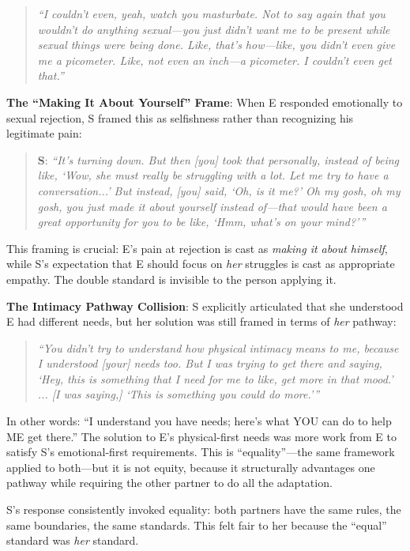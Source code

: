 \documentclass[12pt,openany]{book}
\numberwithin{equation}{chapter}
\begin{document}
\begin{quote}
\textit{``I couldn't even, yeah, watch you masturbate. Not to say again that you wouldn't do anything sexual---you just didn't want me to be present while sexual things were being done. Like, that's how---like, you didn't even give me a picometer. Like, not even an inch---a picometer. I couldn't even get that.''}
\end{quote}

\textbf{The ``Making It About Yourself'' Frame}: When E responded emotionally to sexual rejection, S framed this as selfishness rather than recognizing his legitimate pain:

\begin{quote}
\textbf{S}: \textit{``It's turning down. But then [you] took that personally, instead of being like, `Wow, she must really be struggling with a lot. Let me try to have a conversation...' But instead, [you] said, `Oh, is it me?' Oh my gosh, oh my gosh, you just made it about yourself instead of---that would have been a great opportunity for you to be like, `Hmm, what's on your mind?'''}
\end{quote}

This framing is crucial: E's pain at rejection is cast as \textit{making it about himself}, while S's expectation that E should focus on \textit{her} struggles is cast as appropriate empathy. The double standard is invisible to the person applying it.

\textbf{The Intimacy Pathway Collision}: S explicitly articulated that she understood E had different needs, but her solution was still framed in terms of \textit{her} pathway:

\begin{quote}
\textit{``You didn't try to understand how physical intimacy means to me, because I understood [your] needs too. But I was trying to get there and saying, `Hey, this is something that I need for me to like, get more in that mood.' ... [I was saying,] `This is something you could do more.'''}
\end{quote}

In other words: ``I understand you have needs; here's what YOU can do to help ME get there.'' The solution to E's physical-first needs was more work from E to satisfy S's emotional-first requirements. This is ``equality''---the same framework applied to both---but it is not equity, because it structurally advantages one pathway while requiring the other partner to do all the adaptation.

S's response consistently invoked equality: both partners have the same rules, the same boundaries, the same standards. This felt fair to her because the ``equal'' standard was \textit{her} standard.
\end{document}
